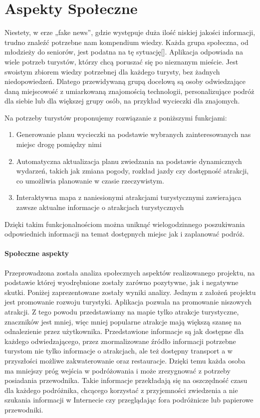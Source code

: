 

\section{Aspekty Społeczne}
\label{subsec:aspekty-spoleczne}



\indent Niestety, w erze „fake news”, gdzie występuje duża ilość niskiej jakości informacji, trudno znaleźć potrzebne nam kompendium wiedzy. Każda grupa społeczna, od młodzieży do seniorów, jest podatna na tę sytuację[].
Aplikacja odpowiada na wiele potrzeb turystów, którzy chcą poruszać się po nieznanym mieście. Jest swoistym zbiorem wiedzy potrzebnej dla każdego turysty, bez żadnych niedopowiedzeń. Dlatego przewidywaną grupą docelową są osoby odwiedzające daną miejscowość z umiarkowaną znajomością technologii, personalizujące podróż dla siebie lub dla większej grupy osób, na przykład wycieczki dla znajomych.




\indent Na potrzeby turystów proponujemy rozwiązanie z poniższymi funkcjami:
\begin{enumerate}
   \item 	Generowanie planu wycieczki na podstawie wybranych zainteresowanych nas miejsc drogę pomiędzy nimi
   \item 	Automatyczna aktualizacja planu zwiedzania na podstawie dynamicznych wydarzeń, takich jak zmiana pogody, rozkład jazdy czy dostępność atrakcji, co umożliwia planowanie w czasie rzeczywistym.
   \item	Interaktywna mapa z naniesionymi atrakcjami turystycznymi zawierająca zawsze aktualne informacje o atrakcjach turystycznych
\end{enumerate}
\indent Dzięki takim funkcjonalnościom można uniknąć wielogodzinnego poszukiwania odpowiednich informacji na temat dostępnych miejsc jak i zaplanować podróż.
\paragraph*{Społeczne aspekty}
\indent Przeprowadzona została analiza społecznych aspektów realizowanego projektu, na podstawie której wyodrębnione zostały zarówno pozytywne, jak i negatywne skutki. Poniżej zaprezentowane zostały wyniki analizy.
\indent Jednym z założeń projektu jest promowanie rozwoju turystyki. Aplikacja pozwala na promowanie niszowych atrakcji.
Z tego powodu przedstawiamy na mapie tylko atrakcje turystyczne, znaczników jest mniej, więc mniej popularne atrakcje mają większą szansę na odnalezienie przez użytkownika.
\indent Przedstawione informacje są jak dostępne dla każdego odwiedzającego, przez znormalizowane źródło informacji potrzebne turystom nie tylko informacje o atrakcjach, ale też dostępny transport a w przyszłości  możliwe zakwaterowanie oraz restauracje.
Dzięki temu każda osoba ma mniejszy próg wejścia w podróżowania i może zrezygnować z potrzeby posiadania przewodnika.
Takie informacje przekładają się na oszczędność czasu dla każdego podróżnika, chcącego korzystać z przyjemności zwiedzenia a nie szukania informacji w Internecie czy przeglądając fora podróżnicze lub papierowe przewodniki.


